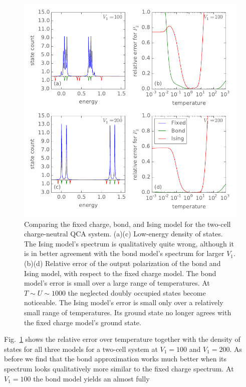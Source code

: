 %
\begin{figure}
  \center
  \includegraphics{ising_approximation2}
  \caption{
  Comparing the fixed charge, bond, and Ising model for the two-cell
  charge-neutral QCA system. (a)(c) Low-energy density of states. The Ising
  model's spectrum is qualitatively quite wrong, although it is in better
  agreement with the bond model's spectrum for larger $V_1$. (b)(d) Relative
  error of the output polarization of the bond and Ising model, with respect to
  the fixed charge model. The bond model's error is small over a large range of
  temperatures. At $T \sim U \sim 1000$ the neglected doubly occupied states
  become noticeable. The Ising model's error is small only over a relatively
  small range of temperatures. Its ground state no longer agrees with the fixed
  charge model's ground state.
  }
  \label{fig:ising_approximation2}
\end{figure}
%
Fig.~\ref{fig:ising_approximation2} shows the relative error over temperature
together with the density of states for all three models for a two-cell system
at $V_1 = 100$ and $V_1 = 200$. As before we find that the bond approximation
works much better when its spectrum looks qualitatively more similar to the
fixed charge spectrum. At $V_1 = 100$ the bond model yields an almost fully
